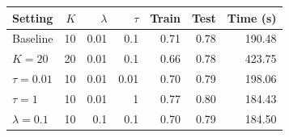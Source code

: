 \begin{tabular*}{\linewidth}{@{\extracolsep{\fill}}lrrrrrr}
\toprule
Setting & $K$ & $\lambda$ & $\tau$ & Train & Test & Time (s) \\
\midrule
Baseline & 10 & 0.01 & 0.1 & 0.71 & 0.78 & 190.48 \\
$K=20$ & 20 & 0.01 & 0.1 & 0.66 & 0.78 & 423.75 \\
$\tau=0.01$ & 10 & 0.01 & 0.01 & 0.70 & 0.79 & 198.06 \\
$\tau=1$ & 10 & 0.01 & 1 & 0.77 & 0.80 & 184.43 \\
$\lambda=0.1$ & 10 & 0.1 & 0.1 & 0.70 & 0.79 & 184.50 \\
\bottomrule
\end{tabular*}
